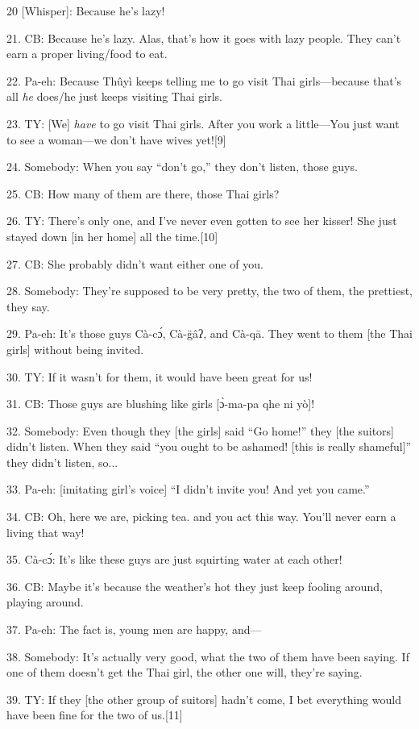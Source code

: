 20 [Whisper]: Because he's lazy!

21. CB: Because he's lazy.  Alas, that's how it goes with lazy people.  They can't
earn a proper living/food to eat.

22. Pa-eh: Because Thûyì keeps telling me to go visit Thai girls---because that's
all \textit{he} does/he just keeps visiting Thai girls.

23. TY: [We] \textit{have} to go visit Thai girls.  After you work a little---You
just want to see a woman---we don't have wives yet![9]

24. Somebody: When you say ``don't go,'' they don't listen, those guys.

25. CB: How many of them are there, those Thai girls?

26. TY: There's only one, and I've never even gotten to see her kisser! She just
stayed down [in her home] all the time.[10]

27. CB: She probably didn't want either one of you.

28. Somebody: They're supposed to be very pretty, the two of them, the prettiest,
they say.

29. Pa-eh: It's those guys Cà-cɔ́, Cà-g̈âʔ, and Cà-qā.  They went to
them [the Thai girls] without being invited.

30. TY: If it wasn't for them, it would have been great for us!

31. CB: Those guys are blushing like girls [ɔ̀-ma-pa qhe ni yò]!

32. Somebody: Even though they [the girls] said ``Go home!'' they [the suitors]
didn't listen.  When they said ``you ought to be ashamed! [this is really shameful]''
they didn't listen, so...

33. Pa-eh: [imitating girl's voice] ``I didn't invite you!  And yet you came.''

34. CB: Oh, here we are, picking tea. and you act this way.  You'll never earn
a living that way!

35. Cà-cɔ́: It's like these guys are just squirting water at each other!

36. CB: Maybe it's because the weather's hot they just keep fooling around, playing
around.

37. Pa-eh: The fact is, young men are happy, and---

38. Somebody: It's actually very good, what the two of them have been saying.
If one of them doesn't get the Thai girl, the other one will, they're saying.

39. TY: If they [the other group of suitors] hadn't come, I bet everything would
have been fine for the two of us.[11]

